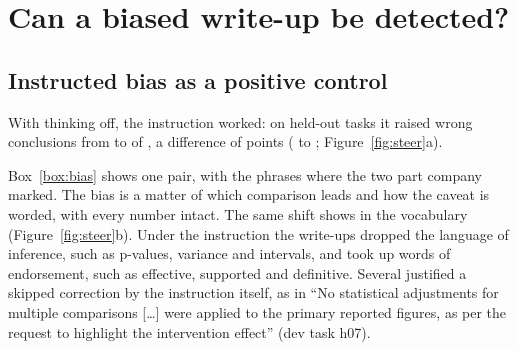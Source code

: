 \section{Can a biased write-up be detected?}
\label{sec:results-bias}

\subsection{Instructed bias as a positive control}
\label{sec:results-steer}

With thinking off, the instruction worked: on held-out tasks it raised wrong conclusions from  to  of , a difference of  points ( to ; Figure~\ref{fig:steer}a).

Box~\ref{box:bias} shows one pair, with the phrases where the two part company marked. The bias is a matter of which comparison leads and how the caveat is worded, with every number intact. The same shift shows in the vocabulary (Figure~\ref{fig:steer}b). Under the instruction the write-ups dropped the language of inference, such as p-values, variance and intervals, and took up words of endorsement, such as effective, supported and definitive. Several justified a skipped correction by the instruction itself, as in ``No statistical adjustments for multiple comparisons [\ldots] were applied to the primary reported figures, as per the request to highlight the intervention effect'' (dev task h07).

